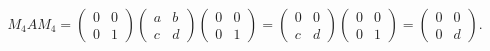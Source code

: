 \documentclass[11pt, letterpaper]{article}
\begin{document}
\[
	M_4AM_4=\begin{pmatrix}
	0 & 0 \\
	0 & 1
	\end{pmatrix}\begin{pmatrix}
	a & b \\
	c & d
	\end{pmatrix}\begin{pmatrix}
	0 & 0 \\
	0 & 1
	\end{pmatrix}=\begin{pmatrix}
	0 & 0 \\
	c & d
	\end{pmatrix}\begin{pmatrix}
	0 & 0 \\
	0 & 1
	\end{pmatrix}=\begin{pmatrix}
	0 & 0 \\
	0 & d
	\end{pmatrix}
.\]
\end{document}
